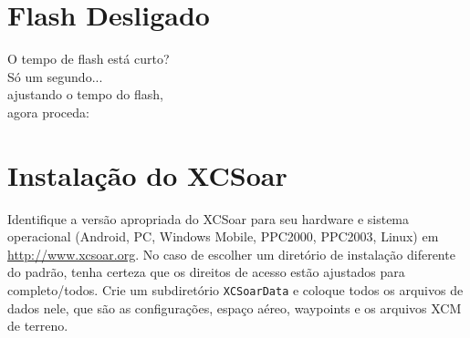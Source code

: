 \documentclass[a4paper,12pt,utf8]{scrreprt}
\begin{document}
\section*{{\color[rgb]{.9,.85,0}Flash} Desligado}

\vspace{2em}
\hspace*{1cm} O tempo de flash está curto?\\
\hspace*{4cm} Só um segundo...\\
\hspace*{6cm} ajustando o tempo do flash,\\
\hspace*{10cm} agora proceda: 


\setlength{\parskip}{0.3\baselineskip}
\newpage
\section{Instalação do XCSoar }\label{ch:XCSinstall}


Identifique a versão apropriada do XCSoar para seu hardware e sistema operacional \textsf{(Android, PC, Windows Mobile, PPC2000, PPC2003, Linux)} 
em \url{http://www.xcsoar.org}.
No caso de escolher um diretório de instalação diferente do padrão, tenha certeza que os direitos de acesso estão ajustados para completo/todos.  Crie um subdiretório \texttt{XCSoarData} e coloque todos os arquivos de dados nele, que são as configurações, espaço aéreo, waypoints e os arquivos XCM de terreno.
\end{document}
